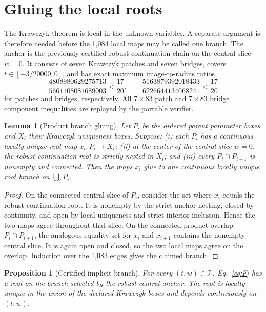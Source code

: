 \documentclass[11pt]{article}
\newtheorem{proposition}{Proposition}
\newtheorem{lemma}{Lemma}
\newcommand{\TT}{\mathcal{T}}
\begin{document}
\section{Gluing the local roots}

The Krawczyk theorem is local in the unknown variables.  A separate argument
is therefore needed before the 1,084 local maps may be called one branch.
The anchor is the previously certified robust continuation chain on the
central slice $w=0$.  It consists of seven Krawczyk patches and seven bridges,
covers $t\in[-3/20000,0]$, and has exact maximum image-to-radius ratios
\begin{equation}
 \frac{4808980629275713}{5661108081689003}<\frac{17}{20},\qquad
 \frac{5163879392018433}{6226644134068241}<\frac{17}{20}
\end{equation}
for patches and bridges, respectively.  All $7\times83$ patch and
$7\times83$ bridge component inequalities are replayed by the portable
verifier.

\begin{lemma}[Product branch gluing]\label{lem:glue}
Let $P_i$ be the ordered parent parameter boxes and $X_i$ their Krawczyk
uniqueness boxes.  Suppose: (i) each $P_i$ has a continuous locally unique
root map $x_i:P_i\to X_i$; (ii) at the center of the central slice $w=0$, the
robust continuation root is strictly nested in $X_i$; and (iii) every
$P_i\cap P_{i+1}$ is nonempty and connected.  Then the maps $x_i$ glue to one
continuous locally unique root branch on $\bigcup_iP_i$.
\end{lemma}

\begin{proof}
On the connected central slice of $P_i$, consider the set where $x_i$ equals
the robust continuation root.  It is nonempty by the strict anchor nesting,
closed by continuity, and open by local uniqueness and strict interior
inclusion.  Hence the two maps agree throughout that slice.  On the connected
product overlap $P_i\cap P_{i+1}$, the analogous equality set for $x_i$ and
$x_{i+1}$ contains the nonempty central slice.  It is again open and closed,
so the two local maps agree on the overlap.  Induction over the 1,083 edges
gives the claimed branch.
\end{proof}

\begin{proposition}[Certified implicit branch]\label{prop:branch}
For every $(t,w)\in\TT$, Eq.~\eqref{eq:F} has a root on the branch selected by
the robust central anchor.  The root is locally unique in the union of the
declared Krawczyk boxes and depends continuously on $(t,w)$.
\end{proposition}
\end{document}
